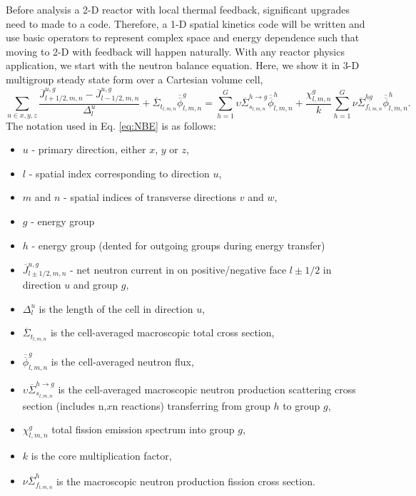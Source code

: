 \documentclass{ansconf}
\numberwithin{equation}{section}
\begin{document}
Before analysis a 2-D reactor with local thermal feedback, significant upgrades need to made to a code. Therefore, a 1-D spatial kinetics code will be written and use basic operators to represent complex space and energy dependence such that moving to 2-D with feedback will happen naturally. With any reactor physics application, we start with the neutron balance equation. Here, we show it in 3-D multigroup steady state form over a Cartesian volume cell,
\begin{equation}
\label{eq:NBE}
\sum_{u \in x,y,z} \frac{\overline{J}^{u,g}_{l+1/2,m,n} - \overline{J}^{u,g}_{l-1/2,m,n}}{\Delta_l^u} + \overline\Sigma_{t_{l,m,n}}\overline{\overline{\phi}}_{l,m,n}^g = \sum_{h=1}^G\upsilon\overline\Sigma^{h\rightarrow g}_{s_{l,m,n}}\overline{\overline{\phi}}_{l,m,n}^h + \frac{\chi_{l,m,n}^g}{k}\sum_{h=1}^G\nu\overline\Sigma^{hg}_{f_{l,m,n}} \overline{\overline{\phi}}_{l,m,n}^h.
\end{equation}
The notation used in Eq. \eqref{eq:NBE} is as follows:
\begin{itemize}
	\item $u$ - primary direction, either $x$, $y$ or $z$,
	\item $l$ - spatial index corresponding to direction $u$,
	\item $m$ and $n$ - spatial indices of transverse directions $v$ and $w$,
	\item $g$ - energy group
	\item $h$ - energy group (dented for outgoing groups during energy transfer)
	\item $\overline{J}^{u,g}_{l\pm1/2,m,n}$ - net neutron current in on positive/negative face $l\pm1/2$ in direction $u$ and group $g$,
	\item $\Delta^u_l$ is the length of the cell in direction $u$,
	\item $\overline\Sigma_{t_{l,m,n}}$ is the cell-averaged macroscopic total cross section,
	\item $\overline{\overline{\phi}}_{l,m,n}^g$ is the cell-averaged neutron flux,
	\item $\upsilon\overline\Sigma^{h\rightarrow g}_{s_{l,m,n}}$ is the cell-averaged macroscopic neutron production scattering cross section (includes n,$x$n reactions) transferring from group $h$ to group $g$,
	\item $\chi_{l,m,n}^g$ total fission emission spectrum into group $g$,
	\item $k$ is the core multiplication factor,
	\item $\nu\overline\Sigma^{h}_{f_{l,m,n}}$ is the macroscopic neutron production fission cross section.
\end{itemize}
\end{document}
